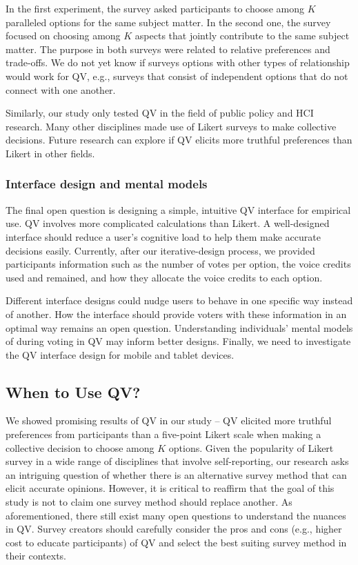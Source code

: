 In the first experiment, the survey asked participants to choose among $K$ paralleled options for the same subject matter. In the second one, the survey focused on choosing among $K$ aspects that jointly contribute to the same subject matter. The purpose in both surveys were related to relative preferences and trade-offs. We do not yet know if surveys options with other types of relationship would work for QV, e.g., surveys that consist of independent options that do not connect with one another.

Similarly, our study only tested QV in the field of public policy and HCI research. Many other disciplines made use of Likert surveys to make collective decisions. Future research can explore if QV elicits more truthful preferences than Likert in other fields.

\subsubsection{Interface design and mental models}
The final open question is designing a simple, intuitive QV interface for empirical use. QV involves more complicated calculations than Likert. A well-designed interface should reduce a user's cognitive load to help them make accurate decisions easily. Currently, after our iterative-design process, we provided participants information such as the number of votes per option, the voice credits used and remained, and how they allocate the voice credits to each option. 

Different interface designs could nudge users to behave in one specific way instead of another. How the interface should provide voters with these information in an optimal way remains an open question. Understanding individuals' mental models of during voting in QV may inform better designs. Finally, we need to investigate the QV interface design for mobile and tablet devices.

\subsection{When to Use QV?}
We showed promising results of QV in our study -- QV elicited more truthful preferences from participants than a five-point Likert scale when making a collective decision to choose among $K$ options. Given the popularity of Likert survey in a wide range of disciplines that involve self-reporting, our research asks an intriguing question of whether there is an alternative survey method that can elicit accurate opinions. However, it is critical to reaffirm that the goal of this study is not to claim one survey method should replace another. As aforementioned, there still exist many open questions to understand the nuances in QV. Survey creators should carefully consider the pros and cons (e.g., higher cost to educate participants) of QV and select the best suiting survey method in their contexts.

